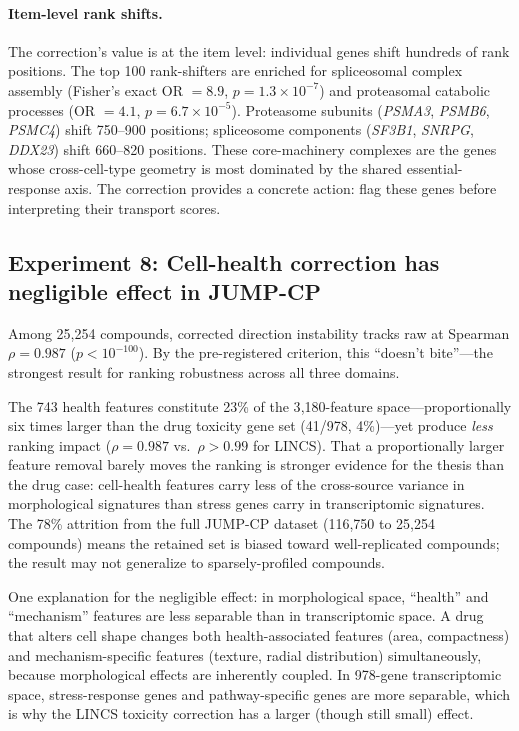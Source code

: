 \documentclass{article}
\begin{document}
\paragraph{Item-level rank shifts.}
The correction's value is at the item level: individual genes shift
hundreds of rank positions. The top 100 rank-shifters are enriched for
spliceosomal complex assembly (Fisher's exact OR $= 8.9$,
$p = 1.3 \times 10^{-7}$) and proteasomal catabolic processes
(OR $= 4.1$, $p = 6.7 \times 10^{-5}$). Proteasome subunits
(\emph{PSMA3}, \emph{PSMB6}, \emph{PSMC4}) shift 750--900 positions;
spliceosome components (\emph{SF3B1}, \emph{SNRPG}, \emph{DDX23}) shift
660--820 positions. These core-machinery complexes are the genes whose
cross-cell-type geometry is most dominated by the shared essential-response
axis. The correction provides a concrete action: flag these genes before
interpreting their transport scores.

\subsection{Experiment 8: Cell-health correction has negligible
effect in JUMP-CP}

Among 25{,}254 compounds, corrected direction instability tracks raw
at Spearman $\rho = 0.987$ ($p < 10^{-100}$). By the pre-registered
criterion, this ``doesn't bite''---the strongest result for ranking
robustness across all three domains.

The 743 health features constitute 23\% of the 3{,}180-feature
space---proportionally six times larger than the drug toxicity gene set
(41/978, 4\%)---yet produce \emph{less} ranking impact ($\rho = 0.987$
vs.\ $\rho > 0.99$ for LINCS). That a proportionally larger feature
removal barely moves the ranking is stronger evidence for the thesis than
the drug case: cell-health features carry less of the cross-source
variance in morphological signatures than stress genes carry in
transcriptomic signatures. The 78\% attrition from the full JUMP-CP
dataset (116{,}750 to 25{,}254 compounds) means the retained set is
biased toward well-replicated compounds; the result may not generalize
to sparsely-profiled compounds.

One explanation for the negligible effect: in morphological space,
``health'' and ``mechanism'' features are less separable than in
transcriptomic space. A drug that alters cell shape changes both
health-associated features (area, compactness) and mechanism-specific
features (texture, radial distribution) simultaneously, because
morphological effects are inherently coupled. In 978-gene transcriptomic
space, stress-response genes and pathway-specific genes are more
separable, which is why the LINCS toxicity correction has a larger
(though still small) effect.
\end{document}
